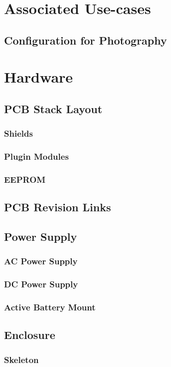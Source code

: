 \documentclass{article}
\begin{document}
\section{Associated Use-cases}
\subsection{Configuration for Photography}

\section{Hardware}
\subsection{PCB Stack Layout}
\subsubsection{Shields}
\subsubsection{Plugin Modules}
\subsubsection{EEPROM}
\subsection{PCB Revision Links}
\subsection{Power Supply}
\subsubsection{AC Power Supply}
\subsubsection{DC Power Supply}
\subsubsection{Active Battery Mount}
\subsection{Enclosure}
\subsubsection{Skeleton}
\end{document}
